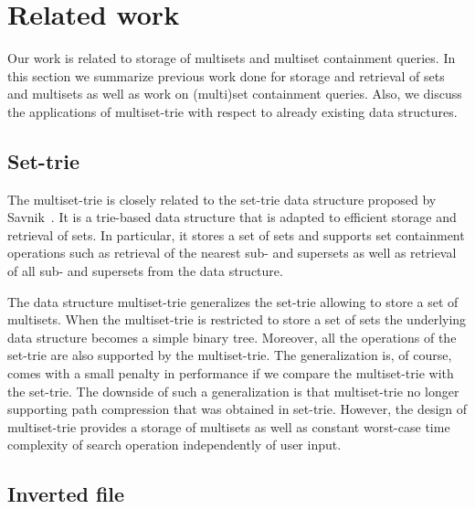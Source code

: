 \section{Related work} \label{c:relwork}


Our work is related to storage of multisets and multiset containment queries. In this section we summarize previous work done 
for storage and retrieval of sets and multisets as well as work on (multi)set containment queries. Also, we discuss the applications 
of multiset-trie with respect to already existing data structures.




\subsection{Set-trie}

The multiset-trie is closely related to the set-trie data structure proposed by Savnik~\cite{savnik2013index}. 
It is a trie-based data structure that is adapted to efficient storage and retrieval of sets. In particular, 
it stores a set of sets and supports set containment operations such as retrieval of the nearest sub- 
and supersets as well as retrieval of all sub- and supersets from the data structure.

The data structure multiset-trie generalizes the set-trie allowing to store a set of multisets. When the multiset-trie 
is restricted to store a set of sets the underlying data structure becomes a simple binary tree. Moreover, all the 
operations of the set-trie are also supported by the multiset-trie. The generalization is, of course, comes with a small penalty 
in performance if we compare the multiset-trie with the set-trie. The downside of such a generalization is that multiset-trie 
no longer supporting path compression that was obtained in set-trie. However, the design of multiset-trie provides a storage 
of multisets as well as constant worst-case time complexity of search operation independently of user input. 


\subsection{Inverted file}


